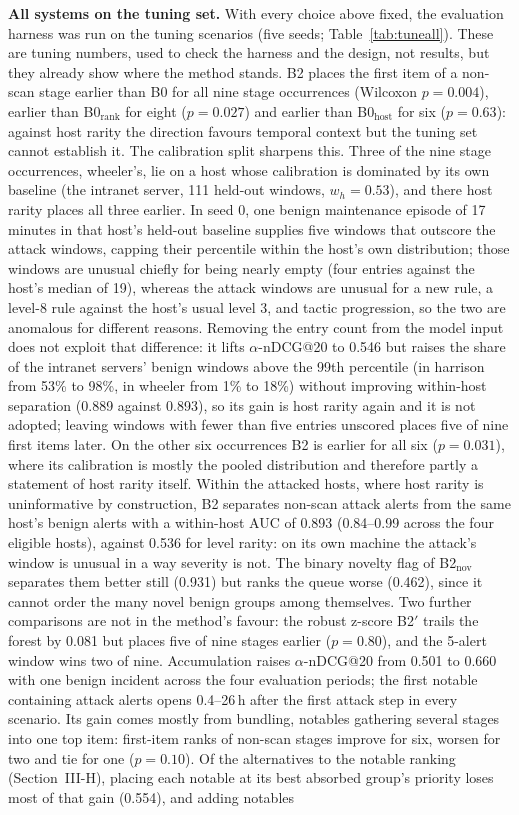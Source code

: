 \documentclass[conference]{IEEEtran}
\begin{document}
\textbf{All systems on the tuning set.} With every choice above fixed, the evaluation harness was run on the tuning scenarios (five seeds; Table~\ref{tab:tuneall}). These are tuning numbers, used to check the harness and the design, not results, but they already show where the method stands. B2 places the first item of a non-scan stage earlier than B0 for all nine stage occurrences (Wilcoxon $p = 0.004$), earlier than B0$_\mathrm{rank}$ for eight ($p = 0.027$) and earlier than B0$_\mathrm{host}$ for six ($p = 0.63$): against host rarity the direction favours temporal context but the tuning set cannot establish it. The calibration split sharpens this. Three of the nine stage occurrences, wheeler's, lie on a host whose calibration is dominated by its own baseline (the intranet server, 111 held-out windows, $w_h = 0.53$), and there host rarity places all three earlier. In seed 0, one benign maintenance episode of 17 minutes in that host's held-out baseline supplies five windows that outscore the attack windows, capping their percentile within the host's own distribution; those windows are unusual chiefly for being nearly empty (four entries against the host's median of 19), whereas the attack windows are unusual for a new rule, a level-8 rule against the host's usual level 3, and tactic progression, so the two are anomalous for different reasons. Removing the entry count from the model input does not exploit that difference: it lifts $\alpha$-nDCG@20 to 0.546 but raises the share of the intranet servers' benign windows above the 99th percentile (in harrison from 53\% to 98\%, in wheeler from 1\% to 18\%) without improving within-host separation (0.889 against 0.893), so its gain is host rarity again and it is not adopted; leaving windows with fewer than five entries unscored places five of nine first items later. On the other six occurrences B2 is earlier for all six ($p = 0.031$), where its calibration is mostly the pooled distribution and therefore partly a statement of host rarity itself. Within the attacked hosts, where host rarity is uninformative by construction, B2 separates non-scan attack alerts from the same host's benign alerts with a within-host AUC of 0.893 (0.84--0.99 across the four eligible hosts), against 0.536 for level rarity: on its own machine the attack's window is unusual in a way severity is not. The binary novelty flag of B2$_\mathrm{nov}$ separates them better still (0.931) but ranks the queue worse (0.462), since it cannot order the many novel benign groups among themselves. Two further comparisons are not in the method's favour: the robust z-score B2$'$ trails the forest by 0.081 but places five of nine stages earlier ($p = 0.80$), and the 5-alert window wins two of nine. Accumulation raises $\alpha$-nDCG@20 from 0.501 to 0.660 with one benign incident across the four evaluation periods; the first notable containing attack alerts opens 0.4--26\,h after the first attack step in every scenario. Its gain comes mostly from bundling, notables gathering several stages into one top item: first-item ranks of non-scan stages improve for six, worsen for two and tie for one ($p = 0.10$). Of the alternatives to the notable ranking (Section~III-H), placing each notable at its best absorbed group's priority loses most of that gain (0.554), and adding notables 
\end{document}
